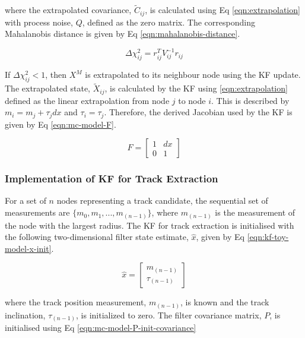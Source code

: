 where the extrapolated covariance, $\widetilde{C}_{ij}$, is calculated using Eq \eqref{eqn:extrapolation} with process noise, $Q$, defined as the zero matrix. The corresponding Mahalanobis distance is given by Eq \eqref{eqn:mahalanobis-distance}.

\begin{equation}
\Delta \chi_{ij}^{2} = r_{ij}^{T} {V}_{ij}^{-1} r_{ij}
\label{eqn:mahalanobis-distance}
\end{equation}

If $\Delta \chi_{ij}^{2} < 1$, then $X^M$ is extrapolated to its neighbour node using the KF update. The extrapolated state, $\widetilde{X}_{ij}$, is calculated by the KF using \eqref{eqn:extrapolation} defined as the linear extrapolation from node $j$ to node $i$. This is described by $m_i = m_j + \tau_j dx$ and $\tau_i = \tau_j$. Therefore, the derived Jacobian used by the KF is given by Eq \eqref{eqn:mc-model-F}.


\begin{equation}
F = \begin{bmatrix} 1 & dx \\ 0 & 1 \end{bmatrix}
\label{eqn:mc-model-F}
\end{equation}



\subsubsection{Implementation of KF for Track Extraction}

For a set of $n$ nodes representing a track candidate, the sequential set of measurements are $\{m_0, m_1, ..., m_{(n-1)} \}$, where $m_{(n-1)}$ is the measurement of the node with the largest radius. The KF for track extraction is initialised with the following two-dimensional filter state estimate, $\hat{x}$, given by Eq \eqref{eqn:kf-toy-model-x-init}.

\begin{equation}
\hat{x} = \begin{bmatrix} m_{(n-1)} \\ \tau_{(n-1)} \end{bmatrix}
\label{eqn:kf-toy-model-x-init}
\end{equation}

where the track position measurement, $m_{(n-1)}$, is known and the track inclination, $\tau_{(n-1)}$, is initialized to zero. The filter covariance matrix, $P$, is initialised using Eq \eqref{eqn:mc-model-P-init-covariance}

